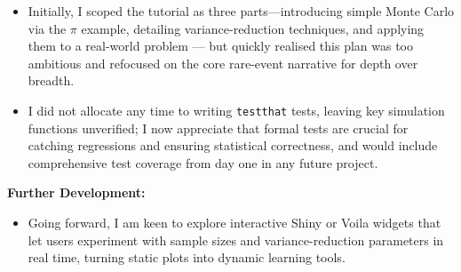 \documentclass[a4paper, 12pt]{article}
\begin{document}
\begin{itemize}
    \item Initially, I scoped the tutorial as three parts—introducing simple Monte Carlo 
    via the $\pi$ example, detailing variance-reduction techniques, 
    and applying them to a real-world problem — but quickly realised this plan was too ambitious 
    and refocused on the core rare-event narrative for depth over breadth.
    \item I did not allocate any time to writing \texttt{testthat} tests, 
    leaving key simulation functions unverified; I now appreciate that formal tests 
    are crucial for catching regressions and ensuring statistical correctness, 
    and would include comprehensive test coverage from day one in any future project.
\end{itemize}

\textbf{Further Development:}

\begin{itemize}
    \item Going forward, I am keen to explore interactive Shiny or Voila widgets
    that let users experiment with sample sizes and variance-reduction parameters in real time, 
    turning static plots into dynamic learning tools.
\end{itemize}
\end{document}
